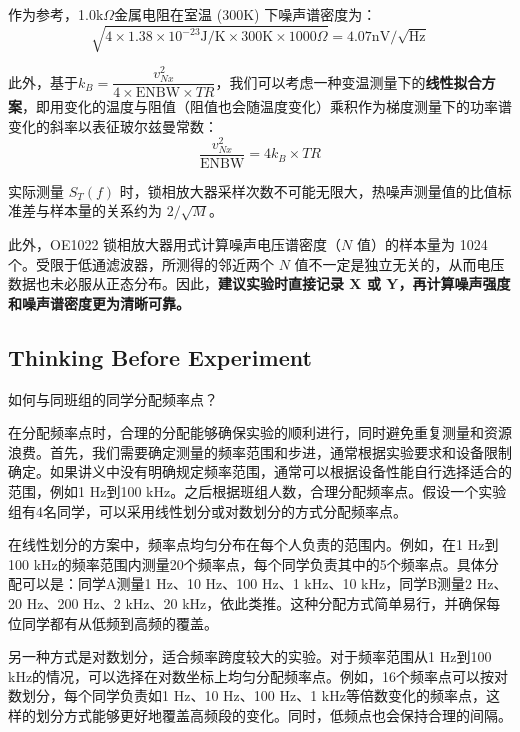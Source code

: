 \begin{enumerate}
	作为参考，1.0k$\Omega$金属电阻在室温 (300K) 下噪声谱密度为：
	\[
	\sqrt{4 \times 1.38 \times 10^{-23} \text{J/K} \times 300\text{K} \times 1000\Omega} = 4.07\text{nV}/\sqrt{\text{Hz}}
	\]
	
	此外，基于$k_B = \dfrac{v_{Nx}^2}{4\times\text{ENBW}\times TR}$，我们可以考虑一种变温测量下的\textbf{线性拟合方案}，即用变化的温度与阻值（阻值也会随温度变化）乘积作为梯度测量下的功率谱变化的斜率以表征玻尔兹曼常数：
	$$
	\dfrac{v_{Nx}^2}{\text{ENBW}}=4k_B\times TR
	$$
	
	实际测量 $S_T(f)$ 时，锁相放大器采样次数不可能无限大，热噪声测量值的比值标准差与样本量的关系约为 $2/\sqrt{M}$。
	
	此外，OE1022 锁相放大器用式计算噪声电压谱密度（$N$ 值）的样本量为 1024 个。受限于低通滤波器，所测得的邻近两个 $N$ 值不一定是独立无关的，从而电压数据也未必服从正态分布。因此，\textbf{建议实验时直接记录 X 或 Y，再计算噪声强度和噪声谱密度更为清晰可靠。}
	
\end{enumerate}


\subsection{Thinking Before Experiment}

\begin{question}
	如何与同班组的同学分配频率点？
\end{question}
在分配频率点时，合理的分配能够确保实验的顺利进行，同时避免重复测量和资源浪费。首先，我们需要确定测量的频率范围和步进，通常根据实验要求和设备限制确定。如果讲义中没有明确规定频率范围，通常可以根据设备性能自行选择适合的范围，例如1 Hz到100 kHz。之后根据班组人数，合理分配频率点。假设一个实验组有4名同学，可以采用线性划分或对数划分的方式分配频率点。

在线性划分的方案中，频率点均匀分布在每个人负责的范围内。例如，在1 Hz到100 kHz的频率范围内测量20个频率点，每个同学负责其中的5个频率点。具体分配可以是：同学A测量1 Hz、10 Hz、100 Hz、1 kHz、10 kHz，同学B测量2 Hz、20 Hz、200 Hz、2 kHz、20 kHz，依此类推。这种分配方式简单易行，并确保每位同学都有从低频到高频的覆盖。

另一种方式是对数划分，适合频率跨度较大的实验。对于频率范围从1 Hz到100 kHz的情况，可以选择在对数坐标上均匀分配频率点。例如，16个频率点可以按对数划分，每个同学负责如1 Hz、10 Hz、100 Hz、1 kHz等倍数变化的频率点，这样的划分方式能够更好地覆盖高频段的变化。同时，低频点也会保持合理的间隔。

